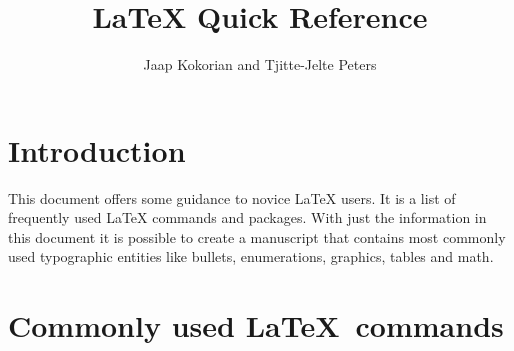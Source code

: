 \documentclass{article}
\title{\LaTeX{} Quick Reference}
\author{Jaap Kokorian and Tjitte-Jelte Peters}
\date{}
\begin{document}
\maketitle
\tableofcontents

\newpage
\section{Introduction}\label{sec:introduction}

This document offers some guidance to novice \LaTeX{} users. It is a list of frequently used \LaTeX{} commands and packages. With just the information in this document it is possible to create a manuscript that contains most commonly used typographic entities like bullets, enumerations, graphics, tables and math.

\section{Commonly used \LaTeX~commands}
\end{document}
